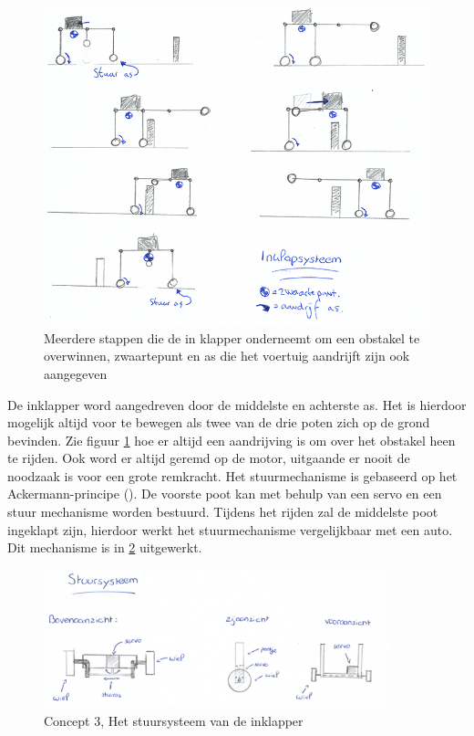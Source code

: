 \begin{figure}[H]
    \includegraphics[width=120mm]{04_idee_ontwikkeling/Verloop_systeem_driepoten.png}
    \caption{Meerdere stappen die de in klapper onderneemt om een obstakel te overwinnen,  zwaartepunt en as die het voertuig aandrijft zijn ook aangegeven}
    \label{fig:stappen_inklapper_met_pakket}
\end{figure}

De inklapper word aangedreven door de middelste en achterste as. Het is hierdoor mogelijk altijd voor te bewegen als twee van de drie poten zich op de grond bevinden. Zie figuur \cref{fig:stappen_inklapper_met_pakket} hoe er altijd een aandrijving is om over het obstakel heen te rijden. Ook word er altijd geremd op de motor, uitgaande er nooit de noodzaak is voor een grote remkracht.  Het stuurmechanisme is gebaseerd op het Ackermann-principe (\cite{Stuurmechanisme}). De voorste poot kan met behulp van een servo en een stuur mechanisme worden bestuurd. Tijdens het rijden zal de middelste poot ingeklapt zijn, hierdoor werkt het stuurmechanisme vergelijkbaar met een auto. Dit mechanisme is in \cref{fig:vierpoter_stuursysteem} uitgewerkt. \\ 

\begin{figure}[H]
    \includegraphics[width = 100mm]{04_conceptKeuze/Foto_stuursysteem.PNG}
    \caption{Concept 3, Het stuursysteem van de inklapper}
    \label{fig:vierpoter_stuursysteem}
\end{figure}

